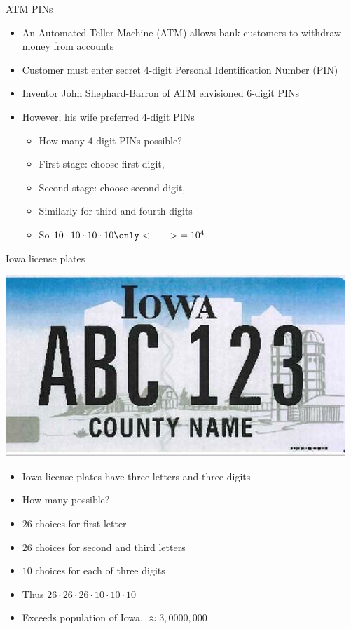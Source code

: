 \documentclass[handout]{beamer}
\theoremstyle{definition}
\begin{document}
\begin{frame}{ATM PINs}
\begin{itemize}
\item An Automated Teller Machine (ATM)
allows bank customers to withdraw money from accounts
\item Customer must enter secret $4$-digit
Personal Identification Number (PIN)
\item Inventor John Shephard-Barron of ATM envisioned $6$-digit PINs
\item However, his wife preferred $4$-digit PINs
\begin{example}
\begin{itemize}
\item How many $4$-digit PINs possible?
\item First stage: choose first digit, 
\item Second stage: choose second digit, 
\item Similarly for third and fourth digits
\item So $10\cdot 10\cdot 10\cdot 10\only<+->{=10^4}$
\end{itemize}
\end{example}
\end{itemize}
\end{frame}

\begin{frame}{Iowa license plates}
\begin{multicols}{2}
\includegraphics[scale=.3]{LicencePlate}
\begin{itemize}
\item Iowa license plates have three letters
and three digits
\item How many possible?
\item $26$ choices for first letter
\columnbreak
\item $26$ choices for second and third letters
\item $10$ choices for each of three digits
\item Thus $26\cdot 26\cdot 26\cdot 10\cdot 10\cdot 10$
\item Exceeds population of Iowa, $\approx 3,0000,000$
\end{itemize}
\end{multicols}
\end{frame}
\end{document}
